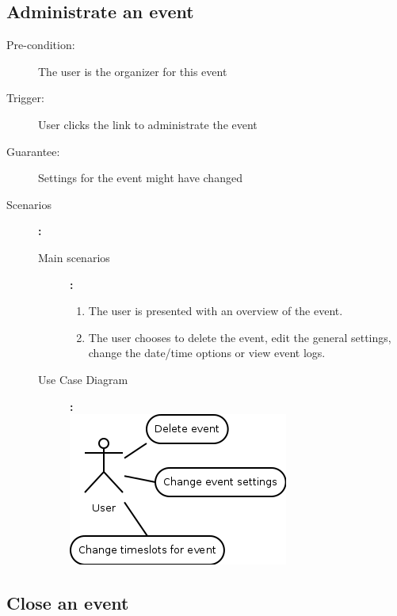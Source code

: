 \subsection{Administrate an event}

\begin{description}
	\item[Pre-condition:] The user is the organizer for this event
	\item[Trigger:] User clicks the link to administrate the event
	\item[Guarantee:] Settings for the event might have changed
	\item[Scenarios]\textbf{:}\\
				\begin{description}
					\item[Main scenarios]\textbf{:}\\
								\begin{enumerate}
									\item The user is presented with an overview of the event.
									\item The user chooses to delete the event, edit the general settings, change the date/time options or view event logs.
								\end{enumerate}
					\item[Use Case Diagram]\textbf{:}\\
						\includegraphics[scale=0.5]{ucd/Diagram3.png}
				\end{description}
\end{description}

\subsection{Close an event}

